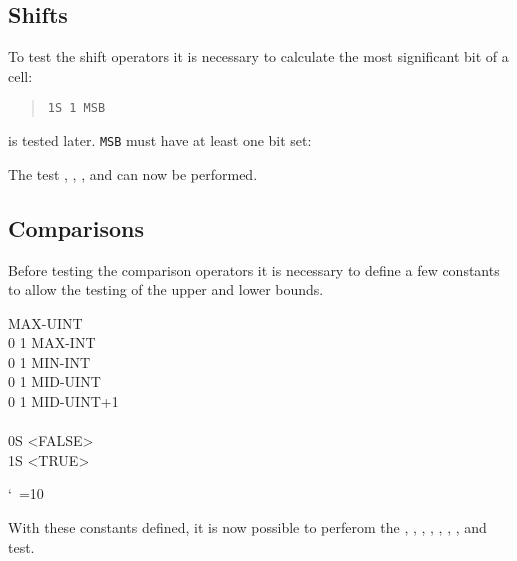 \subsection{Shifts}

To test the shift operators it is necessary to calculate the most
significant bit of a cell:

\begin{quote}
	\texttt{1S 1    MSB}
\end{quote}

 is tested later.
\texttt{MSB} must have at least one bit set:

\begin{quote}
\end{quote}

The test , ,
, and 
can now be performed.

\subsection{Comparisons}

Before testing the comparison operators it is necessary to define
a few constants to allow the testing of the upper and lower bounds.

\begin{tt}\frenchspacing{}                 					 MAX-UINT \\
0  1        			 MAX-INT \\
0  1  	 MIN-INT \\
0  1        			 MID-UINT \\
0  1  	 MID-UINT+1 \\
\\
0S  <FALSE> \\
1S  <TRUE>
\end{tt}
\nonfrenchspacing\catcode`\ =10

With these constants defined, it is now possible to perferom the
	,
	,
	,
	,
	,
	,
	, and
	 test.

